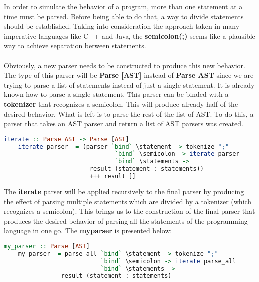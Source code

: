 \documentclass[a4paper, onecolumn]{article}
\begin{document}
    \noindent In order to simulate the behavior of a program, more than one statement at a time must be parsed. Before being able to do that, a way to divide statements should be established. Taking into consideration the approach taken in many imperative languages like C++ and Java, the \textbf{semicolon(;)} seems like a plausible way to achieve separation between statements. \\ \\ 
    Obviously, a new parser needs to be constructed to produce this new behavior. The type of this parser will be \textbf{Parse [AST]} instead of \textbf{Parse AST} since we are trying to parse a list of statements instead of just a single statement. It is already known how to parse a single statement. This parser can be binded with a \textbf{tokenizer} that  recognizes a semicolon. This will produce already half of the desired behavior. What is left is to parse the rest of the list of AST. To do this, a parser that takes an AST parser and return a list of AST parsers was created.
     
    \begin{tcolorbox}
    \begin{lstlisting}[language=Haskell] 
    iterate :: Parse AST -> Parse [AST] 
    iterate parser  = (parser `bind` \statement -> tokenize ";" 
                               `bind` \semicolon -> iterate parser 
                               `bind` \statements -> 
                        result (statement : statements)) 
                        +++ result []
    \end{lstlisting}
    \end{tcolorbox}
    
    \noindent The \textbf{iterate} parser will be applied recursively to the final parser by producing the effect of parsing multiple statements which are divided by a tokenizer (which recognizes a semicolon). This brings us to the construction of the final parser that produces the desired behavior of parsing all the statements of the programming language in one go. The \textbf{my\textunderscore parser} is presented below:
    
    \begin{tcolorbox}
    \begin{lstlisting}[language=Haskell] 
    my_parser :: Parse [AST]
    my_parser  = parse_all `bind` \statement -> tokenize ";" 
                           `bind` \semicolon -> iterate parse_all 
                           `bind` \statements -> 
                result (statement : statements)
    \end{lstlisting}
    \end{tcolorbox}
    
\end{document}
